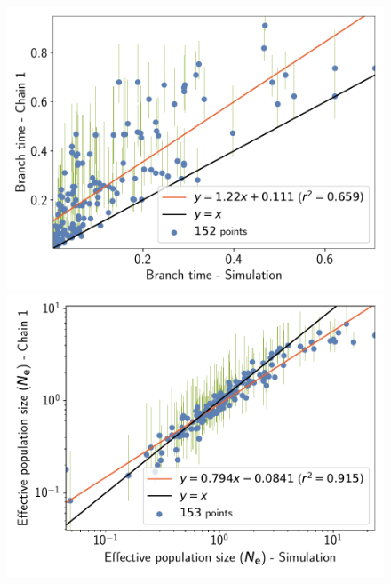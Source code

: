 \documentclass{article}
\begin{document}
\begin{figure}[H]
\begin{minipage}{0.32\linewidth}
			\includegraphics[width=\linewidth, page=1]{simulations/BranchWise_SimuDiv_SiteMutSelBranchNe_BranchCorrelation_BranchTime}
		\end{minipage} \hfill
		\begin{minipage}{0.32\linewidth}
			\includegraphics[width=\linewidth, page=1]{simulations/BranchWise_SimuDiv_SiteMutSelBranchNe_BranchCorrelation_LogPopulationSize}
		\end{minipage}
		\begin{minipage}{0.32\linewidth}

\end{minipage}
\end{figure}
\end{document}
